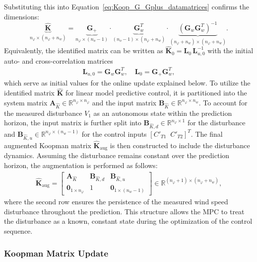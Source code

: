 Substituting this into Equation~\eqref{eq:Koop_G_Gplus_datamatrices} confirms the dimensions:
\[
\underbrace{\hat{\bm{K}}}_{n_\varphi \times (n_\varphi + n_w)} =
\underbrace{\bm{G}_{+}}_{n_\varphi \times (n_o-1)} \cdot
\underbrace{\bm{G}_w^T}_{(n_o-1) \times (n_\varphi + n_w)} \cdot
\underbrace{(\bm{G}_w \bm{G}_w^T)^{-1}}_{(n_\varphi + n_w) \times (n_\varphi + n_w)}.
\]
Equivalently, the identified matrix can be written as $\hat{\bm{K}}_0 = \mathbf{L}_0\,\mathbf{L}_{u,0}^{-1}$ with the initial auto- and cross-correlation matrices
\begin{align*}
    \mathbf{L}_{u,0} = \bm{G}_w \bm{G}_w^T, \quad \mathbf{L}_0 = \bm{G}_{+} \bm{G}_w^T,
\end{align*}
which serve as initial values for the online update explained below.
%
To utilize the identified matrix $\hat{\bm{K}}$ for linear model predictive control, it is partitioned into the system matrix $\bm{A}_{\hat{K}} \in \mathbb{R}^{n_\varphi \times n_\varphi}$ and the input matrix $\bm{B}_{\hat{K}} \in \mathbb{R}^{n_\varphi \times n_w}$. To account for the measured disturbance $V_1$ as an autonomous state within the prediction horizon, the input matrix is further split into $\bm{B}_{\hat{K},d} \in \mathbb{R}^{n_\varphi \times 1}$ for the disturbance and $\bm{B}_{\hat{K},u} \in \mathbb{R}^{n_\varphi \times (n_w-1)}$ for the control inputs $[C'_{T1} \;\; C'_{T2}]^T$.
%
The final augmented Koopman matrix $\hat{\bm{K}}_{\text{aug}}$ is then constructed to include the disturbance dynamics. Assuming the disturbance remains constant over the prediction horizon, the augmentation is performed as follows:
\begin{align} \label{eq:AugmentedKoopmanMPC}
    \hat{\bm{K}}_{\text{aug}} = \left[\begin{array}{cc|c}
        \bm{A}_{\hat{K}} & \bm{B}_{\hat{K},d} & \bm{B}_{\hat{K},u}\\
        \bm{0}_{1 \times n_\varphi} & 1 & \bm{0}_{1 \times (n_w-1)}
    \end{array}\right] \in \mathbb{R}^{(n_\varphi+1) \times (n_\varphi+n_w)},
\end{align}
where the second row ensures the persistence of the measured wind speed disturbance throughout the prediction. This structure allows the MPC to treat the disturbance as a known, constant state during the optimization of the control sequence.


\subsubsection{Koopman Matrix Update}\label{subsec:koopmanOnlineUpdate}


